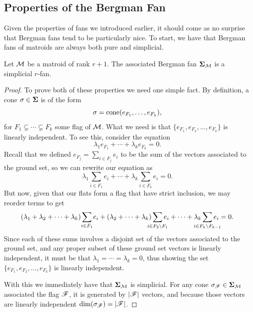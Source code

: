 \documentclass[12pt,oneside]{../../sfsuthesis}
\begin{document}
\subsection{Properties of the Bergman Fan}
Given the properties of fans we introduced earlier, it should come as no surprise that Bergman fans tend to be particularly nice.
To start, we have that Bergman fans of matroids are always both pure and simplicial.
\begin{proposition}\th\label{thm:bergFanSimPure}
    Let \( \mathcal{M} \) be a matroid of rank \( r + 1 \).
    The associated Bergman fan \( \bm{\Sigma}_{\mathcal{M}} \) is a simplicial \( r \)-fan.
\end{proposition}
\begin{proof}
    To prove both of these properties we need one simple fact.
    By definition, a cone \( \sigma \in \bm{\Sigma} \) is of the form
    \[
        \sigma = \mathrm{cone}( e_{F_1}, \dots, e_{F_k} ),
    \]
    for \( F_1 \subsetneq \cdots \subsetneq F_k \) some flag of \( \mathcal{M} \).
    What we need is that \( \{e_{F_1}, e_{F_2}, \dots, e_{F_k} \} \) is linearly independent.
    To see this, consider the equation
    \[
        \lambda_{1}e_{F_1} + \cdots + \lambda_{k}e_{F_{k}} = 0.
    \]
    Recall that we defined \( e_{F_j} = \sum_{i \in F_{j} } e_i \) to be the sum of the vectors associated to the ground set, so we can rewrite our equation as
    \[
        \lambda_{1}\sum_{i \in F_{1} } e_i + \cdots + \lambda_{k}\sum_{i \in F_{k} } e_i = 0.
    \]
    But now, given that our flats form a flag that have strict inclusion, we may reorder terms to get
    \[
        (\lambda_1 + \lambda_2 + \cdots + \lambda_k) \sum_{\mathclap{i \in F_1}} e_i
        + (\lambda_2 + \cdots + \lambda_k) \sum_{\mathclap{i \in F_2 \setminus F_1}} e_i
        + \cdots
        + \lambda_k \sum_{\mathclap{i \in F_k \setminus F_{k-1}}} e_i  = 0.
    \]
    Since each of these sums involves a disjoint set of the vectors associated to the ground set, and any proper subset of these ground set vectors is linearly independent, it must be that \( \lambda_1 = \cdots = \lambda_k = 0 \), thus showing the set \( \{e_{F_1}, e_{F_2}, \dots, e_{F_k} \} \) is linearly independent.

    With this we immediately have that \( \bm{\Sigma}_{\mathcal{M}} \) is simplicial.
    For any cone \( \sigma_{\mathscr{F}} \in \bm{\Sigma}_{\mathcal{M}} \) associated the flag \( \mathscr{F} \), it is generated by \( |\mathscr{F}| \) vectors, and because those vectors are linearly independent \( \dim(\sigma_{\mathscr{F}}) = |\mathscr{F}| \).


\end{proof}
\end{document}
